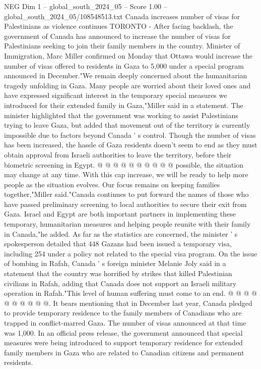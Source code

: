 \begin{textsample}{NEG Dim 1 – global\_south\_2024\_05 – Score 1.00 – global\_south\_2024\_05/108548513.txt}  \label{ex:f1_neg_210}
Canada increases number of visas for Palestinians as violence continues TORONTO - After facing backlash, the government of Canada has announced to increase the number of visas for Palestinians seeking to join their family members in the country.
Minister of Immigration, Marc Miller confirmed on Monday that Ottawa would increase the number of visas offered to residents in Gaza to 5,000 under a special program announced in December."We remain deeply concerned about the humanitarian tragedy unfolding in Gaza.
Many people are worried about their loved ones and have expressed significant interest in the temporary special measures we introduced for their extended family in Gaza,"Miller said in a statement.
The minister highlighted that the government was working to assist Palestinians trying to leave Gaza, but added that movement out of the territory is currently impossible due to factors beyond Canada ' s control.
Though the number of visas has been increased, the hassle of Gaza residents doesn't seem to end as they must obtain approval from Israeli authorities to leave the territory, before their biometric screening in Egypt. @ @ @ @ @ @ @ @ @ @ possible, the situation may change at any time.
With this cap increase, we will be ready to help more people as the situation evolves.
Our focus remains on keeping families together,"Miller said."Canada continues to put forward the names of those who have passed preliminary screening to local authorities to secure their exit from Gaza.
Israel and Egypt are both important partners in implementing these temporary, humanitarian measures and helping people reunite with their family in Canada,"he added.
As far as the statistics are concerned, the minister ' s spokesperson detailed that 448 Gazans had been issued a temporary visa, including 254 under a policy not related to the special visa program.
On the issue of bombing in Rafah, Canada ' s foreign minister Melanie Joly said in a statement that the country was horrified by strikes that killed Palestinian civilians in Rafah, adding that Canada does not support an Israeli military operation in Rafah."This level of human suffering must come to an end. @ @ @ @ @ @ @ @ @ @.
It bears mentioning that in December last year, Canada pledged to provide temporary residence to the family members of Canadians who are trapped in conflict-marred Gaza.
The number of visas announced at that time was 1,000.
In an official press release, the government announced that special measures were being introduced to support temporary residence for extended family members in Gaza who are related to Canadian citizens and permanent residents.

\end{textsample}
